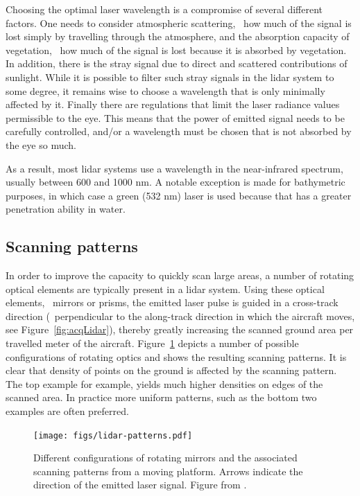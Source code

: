 Choosing the optimal laser wavelength is a compromise of several different factors. 
One needs to consider atmospheric scattering, 
\ie\ how much of the signal is lost simply by travelling through the atmosphere, and the absorption capacity of vegetation, \ie\ how much of  the signal is lost because it is absorbed by vegetation. In addition, there is the stray signal due to direct and scattered contributions of sunlight. While it is possible to filter such stray signals in the lidar system to some degree, it remains wise to choose a wavelength that is only minimally affected by it. Finally there are regulations that limit the laser radiance values permissible to the eye. This means that the power of emitted signal needs to be carefully controlled, and/or a wavelength must be chosen that  is not absorbed by the eye so much.

As a result, most lidar systems use a wavelength in the near-infrared spectrum, usually between 600 and 1000 nm. A notable exception is made for bathymetric purposes, in which case a green (532 nm) laser is used because that has a greater penetration ability in water.

\subsection{Scanning patterns}
In order to improve the capacity to quickly scan large areas, a number of rotating optical elements are typically present in a lidar system. Using these optical elements, \ie\  mirrors or prisms, the emitted laser pulse is guided in a cross-track direction (\ie\ perpendicular to the along-track direction in which  the aircraft moves, see Figure~\ref{fig:acqLidar}),  thereby greatly increasing the scanned ground area  per travelled meter of the aircraft.
Figure~\ref{fig:lidar-patterns} depicts a number of possible configurations of rotating optics and shows the resulting scanning patterns. It is clear that density of points on the ground is affected by the scanning pattern. The top example for example, yields much higher densities on edges of the scanned area. In practice more uniform patterns, such  as the bottom two examples are often preferred.

\begin{figure}
	\centering
	\texttt{[image: figs/lidar-patterns.pdf]}
	\caption{Different configurations of rotating mirrors and the associated scanning patterns from a moving platform. Arrows indicate the direction of the emitted laser signal. Figure from \citet{Chazette16}.}%
\label{fig:lidar-patterns}
\end{figure}



